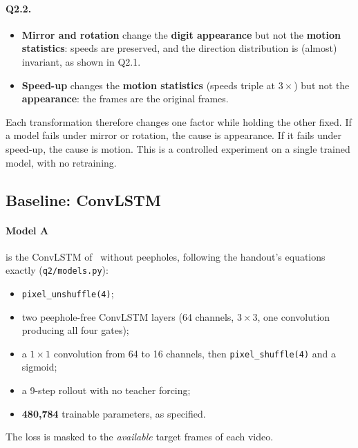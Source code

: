 \documentclass[11pt,a4paper]{article}
\begin{document}
\paragraph{Q2.2.}
\begin{itemize}
  \item \textbf{Mirror and rotation} change the \textbf{digit appearance} but
        not the \textbf{motion statistics}: speeds are preserved, and the
        direction distribution is (almost) invariant, as shown in Q2.1.
  \item \textbf{Speed-up} changes the \textbf{motion statistics} (speeds triple
        at $3\times$) but not the \textbf{appearance}: the frames are the
        original frames.
\end{itemize}
Each transformation therefore changes one factor while holding the other fixed.
If a model fails under mirror or rotation, the cause is appearance. If it fails
under speed-up, the cause is motion. This is a controlled experiment on a
single trained model, with no retraining.

\subsection{Baseline: ConvLSTM}

\paragraph{Model A} is the ConvLSTM of~\cite{shi} without peepholes, following
the handout's equations exactly (\texttt{q2/models.py}):
\begin{itemize}
  \item \texttt{pixel\_unshuffle(4)};
  \item two peephole-free ConvLSTM layers (64 channels, $3\times3$, one
        convolution producing all four gates);
  \item a $1\times1$ convolution from 64 to 16 channels, then
        \texttt{pixel\_shuffle(4)} and a sigmoid;
  \item a 9-step rollout with no teacher forcing;
  \item \textbf{480,784} trainable parameters, as specified.
\end{itemize}
The loss is masked to the \emph{available} target frames of each video.
\end{document}
